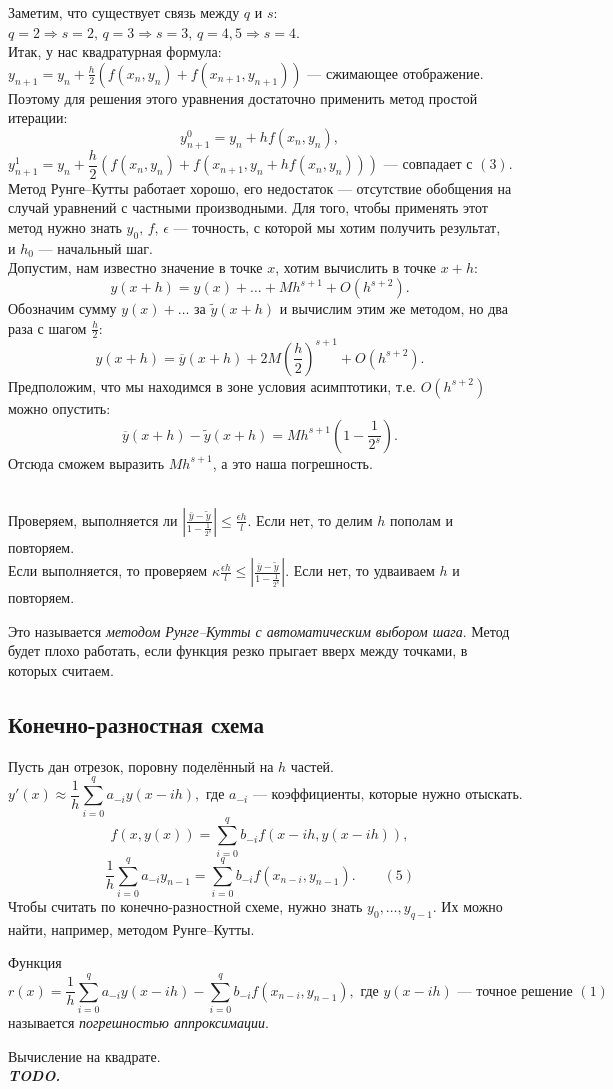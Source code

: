 Заметим, что существует связь между $q$ и $s$: $q=2 \Rightarrow s=2, \, q=3 \Rightarrow s=3, \, q=4,5 \Rightarrow s=4$.\\
Итак, у нас квадратурная формула: $y_{n+1}=y_n+\frac{h}{2}\left( f(x_n,y_n)+f(x_{n+1},y_{n+1}) \right)$  --- сжимающее отображение. Поэтому для решения этого уравнения достаточно применить метод простой итерации:
$$y_{n+1}^0 = y_n + hf(x_n,y_n),$$
$$y_{n+1}^1 = y_n + \frac{h}{2}\left( f(x_n,y_n)+f(x_{n+1}, y_n+hf(x_n,y_n)) \right) \text{ --- совпадает с } (3).$$
Метод Рунге--Кутты работает хорошо, его недостаток --- отсутствие обобщения на случай уравнений с частными производными. Для того, чтобы применять этот метод нужно знать $y_0, \, f, \, \epsilon$ --- точность, с которой мы хотим получить результат, и $h_0$ --- начальный шаг.\\
Допустим, нам известно значение в точке $x$, хотим вычислить в точке $x+h$:
$$y(x+h) = y(x) + \dots + Mh^{s+1} + O(h^{s+2}).$$
Обозначим сумму $y(x) + \dots$ за $\tilde{y}(x+h)$ и вычислим этим же методом, но два раза с шагом $\frac{h}{2}$:
$$y(x+h) = \overline{y}(x+h) + 2M\left( \frac{h}{2} \right)^{s+1} + O(h^{s+2}).$$
Предположим, что мы находимся в зоне условия асимптотики, т.е. $O(h^{s+2})$ можно опустить:
$$\overline{y}(x+h) - \tilde{y}(x+h) = Mh^{s+1}\left( 1 - \frac{1}{2^s} \right).$$
Отсюда сможем выразить $Mh^{s+1}$, а это наша погрешность.
\begin{lm} \label{Runge-test}~\\
	Проверяем, выполняется ли $\left| \frac{\overline{y}-\tilde{y}}{1-\frac{1}{2^s}} \right| \leq \frac{\epsilon h}{l}$. Если нет, то делим $h$ пополам и повторяем.\\
	Если выполняется, то проверяем $\kappa\frac{\epsilon h}{l} \leq \left| \frac{\overline{y}-\tilde{y}}{1-\frac{1}{2^s}} \right|$. Если нет, то удваиваем $h$ и повторяем.
\end{lm}
Это называется \emph{методом Рунге--Кутты с автоматическим выбором шага}. Метод будет плохо работать, если функция резко прыгает вверх между точками, в которых считаем.

\subsection{Конечно-разностная схема}
Пусть дан отрезок, поровну поделённый на $h$ частей.
$$y'(x) \approx \frac{1}{h}\sum_{i=0}^q a_{-i}y(x-ih), \text{ где } a_{-i} \text{ --- коэффициенты, которые нужно отыскать}.$$
$$f(x, y(x)) = \sum_{i=0}^q b_{-i} f(x-ih, y(x-ih)),$$
$$\frac{1}{h}\sum_{i=0}^q a_{-i}y_{n-1} = \sum_{i=0}^q b_{-i}f(x_{n-i}, y_{n-1}). \qquad (5)$$
Чтобы считать по конечно-разностной схеме, нужно знать $y_0, \dots, y_{q-1}$. Их можно найти, например, методом Рунге--Кутты.
\begin{df} \label{df2-1}
	Функция 
	$$r(x) = \frac{1}{h}\sum_{i=0}^q a_{-i}y(x-ih) - \sum_{i=0}^q b_{-i}f(x_{n-i}, y_{n-1}), \text{ где } y(x-ih) \text{ --- точное решение } (1)$$
	называется \emph{погрешностью аппроксимации}.
\end{df}
\begin{ex} \label{ex2-3}
	Вычисление на квадрате.\\
	\textbf{\textit{TODO.}}
\end{ex}